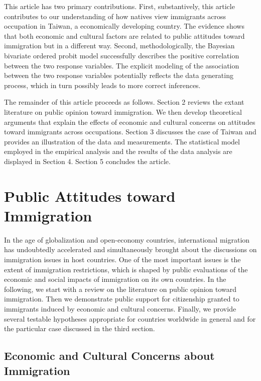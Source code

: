 \documentclass[12pt]{article}
\begin{document}
This article has two primary contributions. First, substantively, this article contributes to our understanding of how natives view immigrants across occupation in Taiwan, a economically developing country. The evidence shows that both economic and cultural factors are related to public attitudes toward immigration but in a different way. Second, methodologically, the Bayesian bivariate ordered probit model successfully describes the positive correlation between the two response variables. The explicit modeling of the association between the two response variables potentially reflects the data generating process, which in turn possibly leads to more correct inferences.


The remainder of this article proceeds as follows. Section 2 reviews the extant literature on public opinion toward immigration. We then develop theoretical arguments that explain the effects of economic and cultural concerns on attitudes toward immigrants across occupations. Section 3 discusses the case of Taiwan and provides an illustration of the data and measurements. The statistical model employed in the empirical analysis and the results of the data analysis are displayed in Section 4. Section 5 concludes the article.



\section{Public Attitudes toward Immigration}


In the age of globalization and open-economy countries, international migration has undoubtedly accelerated and simultaneously brought about the discussions on immigration issues in host countries. One of the most important issues is the extent of immigration restrictions, which is shaped by public evaluations of the economic and social impacts of immigration on its own countries. In the following, we start with a review on the literature on public opinion toward immigration. Then we demonstrate public support for citizenship granted to immigrants induced by economic and cultural concerns. Finally, we provide several testable hypotheses appropriate for countries worldwide in general and for the particular case discussed in the third section.



\subsection{Economic and Cultural Concerns about Immigration}
\end{document}
